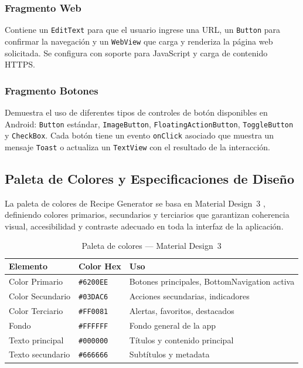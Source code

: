\documentclass[stu, 12pt, letterpaper, donotrepeattitle, floatsintext, natbib]{apa7}
\begin{document}
\subsubsection{Fragmento Web}

Contiene un \texttt{EditText} para que el usuario ingrese una URL, un \texttt{Button}
para confirmar la navegación y un \texttt{WebView} que carga y renderiza la página web
solicitada. Se configura con soporte para JavaScript y carga de contenido HTTPS.

\subsubsection{Fragmento Botones}

Demuestra el uso de diferentes tipos de controles de botón disponibles en Android:
\texttt{Button} estándar, \texttt{ImageButton}, \texttt{FloatingActionButton},
\texttt{ToggleButton} y \texttt{CheckBox}. Cada botón tiene un evento \texttt{onClick}
asociado que muestra un mensaje \texttt{Toast} o actualiza un \texttt{TextView} con el
resultado de la interacción.

\subsection{Paleta de Colores y Especificaciones de Diseño}

La paleta de colores de Recipe Generator se basa en Material Design~3
\citep{googlematerial2024}, definiendo colores primarios, secundarios y terciarios que
garantizan coherencia visual, accesibilidad y contraste adecuado en toda la interfaz
de la aplicación.

\begin{table}[H]
\caption{Paleta de colores --- Material Design~3}
\label{tab:colores}
\begin{tabularx}{\textwidth}{@{}llX@{}}
\toprule
\textbf{Elemento}   & \textbf{Color Hex}  & \textbf{Uso} \\
\midrule
Color Primario      & \texttt{\#6200EE}   & Botones principales, BottomNavigation activa \\
Color Secundario    & \texttt{\#03DAC6}   & Acciones secundarias, indicadores \\
Color Terciario     & \texttt{\#FF0081}   & Alertas, favoritos, destacados \\
Fondo               & \texttt{\#FFFFFF}   & Fondo general de la app \\
Texto principal     & \texttt{\#000000}   & Títulos y contenido principal \\
Texto secundario    & \texttt{\#666666}   & Subtítulos y metadata \\
\bottomrule
\end{tabularx}
\end{table}
\end{document}
